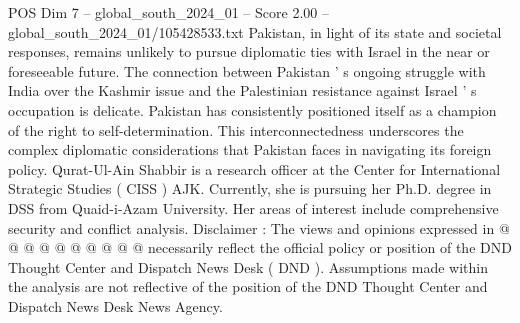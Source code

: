 \begin{textsample}{POS Dim 7 – global\_south\_2024\_01 – Score 2.00 – global\_south\_2024\_01/105428533.txt}
Pakistan, in light of its state and societal responses, remains unlikely to pursue diplomatic ties with Israel in the near or foreseeable future.
The connection between Pakistan ' s ongoing struggle with India over the Kashmir issue and the Palestinian resistance against Israel ' s occupation is delicate.
Pakistan has consistently positioned itself as a champion of the right to self-determination.
This interconnectedness underscores the complex diplomatic considerations that Pakistan faces in navigating its foreign policy.
Qurat-Ul-Ain Shabbir is a research officer at the Center for International Strategic Studies ( CISS ) AJK.
Currently, she is pursuing her Ph.D. degree in DSS from Quaid-i-Azam University.
Her areas of interest include comprehensive security and conflict analysis.
Disclaimer : The views and opinions expressed in @ @ @ @ @ @ @ @ @ @ necessarily reflect the official policy or position of the DND Thought Center and Dispatch News Desk ( DND ).
Assumptions made within the analysis are not reflective of the position of the DND Thought Center and Dispatch News Desk News Agency.

\end{textsample}
